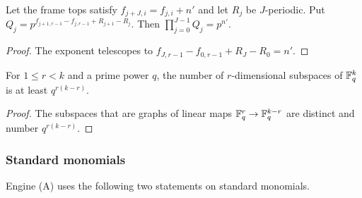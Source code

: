 \begin{lemma}\label{w1:lem:telescope}
Let the frame tops satisfy $f_{j+J,i}=f_{j,i}+n'$ and let $R_j$ be $J$-periodic. Put $Q_j=p^{f_{j+1,r-1}-f_{j,r-1}+R_{j+1}-R_j}$. Then $\prod_{j=0}^{J-1}Q_j=p^{n'}$.
\end{lemma}

\begin{proof}
The exponent telescopes to $f_{J,r-1}-f_{0,r-1}+R_J-R_0=n'$.
\end{proof}

\begin{lemma}\label{w1:lem:gauss}
For $1\le r<k$ and a prime power $q$, the number of $r$-dimensional subspaces of $\mathbb F_q^k$ is at least $q^{r(k-r)}$.
\end{lemma}

\begin{proof}
The subspaces that are graphs of linear maps $\mathbb F_q^r\to\mathbb F_q^{k-r}$ are distinct and number $q^{r(k-r)}$.
\end{proof}

\subsubsection{Standard monomials}

Engine (A) uses the following two statements on standard monomials.


